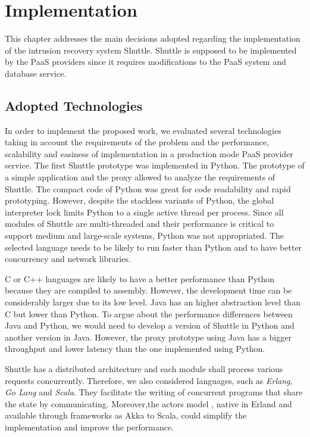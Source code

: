\chapter{Implementation}\label{chapter:implementation}
This chapter addresses the main decisions adopted regarding the implementation of the intrusion recovery system Shuttle. Shuttle is supposed to be implemented by the \acf{PaaS} providers since it requires modifications to the \ac{PaaS} system and database service.

\section{Adopted Technologies}\label{sec:impl:adopted_technologies}
In order to implement the proposed work, we evaluated several technologies taking in account the requirements of the problem and the performance, scalability and easiness of implementation in a production mode \acf{PaaS} provider service.
The first Shuttle prototype was implemented in Python. The prototype of a simple application and the proxy allowed to analyze the requirements of Shuttle. The compact code of Python was great for code readability and rapid prototyping. However, despite the stackless variants of Python, the global interpreter lock limits Python to a single active thread per process. Since all modules of Shuttle are multi-threaded and their performance is critical to support medium and large-scale systems, Python was not appropriated. The selected language needs to be likely to run faster than Python and to have better concurrency and network libraries.

C or C++ languages are likely to have a better performance than Python because they are compiled to assembly. However, the development time can be considerably larger due to its low level. 
Java has an higher abstraction level than C but lower than Python. To argue about the performance differences between Java and Python, we would need to develop a version of Shuttle in Python and another version in Java. However, the proxy prototype using Java has a bigger throughput and lower latency than the one implemented using Python. 

Shuttle has a distributed architecture and each module shall process various requests concurrently. Therefore, we also considered languages, such as \emph{Erlang}, \emph{Go Lang} and \emph{Scala}. They facilitate the writing of concurrent programs that share the state by communicating. Moreover,the actors model \cite{actors}, native in Erland and available through frameworks as Akka \cite{akka} to Scala, could simplify the implementation and improve the performance. 

